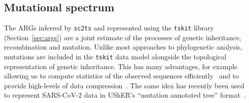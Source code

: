 \documentclass{article}
\begin{document}
\subsection{Mutational spectrum}
\label{sec:mutation_spectrum}
The ARGs inferred by \texttt{sc2ts} and represented using the \texttt{tskit}
library (Section~\ref{sec:args}) are a joint estimate of the processes
of genetic inheritance, recombination and mutation. Unlike most approaches to
phylogenetic analysis, mutations are included in the \texttt{tskit}
data model alongside
the topological representation of genetic inheritance.
This has many
advantages, for example allowing us to compute statistics of the observed
sequences efficiently~\citep{Kelleher2016-wk,Ralph2020-efficiently} and
to provide high-levels of data compression~\citep{Kelleher2019-ba}.
The same idea has recently been used to represent
SARS-CoV-2 data in UShER's ``mutation annotated tree''
format~\citep{Turakhia2021-ur}.
\end{document}
